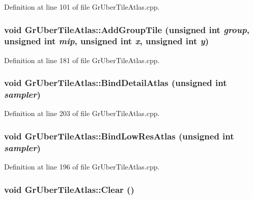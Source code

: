 Definition at line 101 of file GrUberTileAtlas.cpp.\hypertarget{class_gr_uber_tile_atlas_9faf8c4dffaac3e9903aacc01f2ad90e}{
\subsubsection[{AddGroupTile}]{\setlength{\rightskip}{0pt plus 5cm}void GrUberTileAtlas::AddGroupTile (unsigned int {\em group}, \/  unsigned int {\em mip}, \/  unsigned int {\em x}, \/  unsigned int {\em y})}}
\label{class_gr_uber_tile_atlas_9faf8c4dffaac3e9903aacc01f2ad90e}




Definition at line 181 of file GrUberTileAtlas.cpp.\hypertarget{class_gr_uber_tile_atlas_a0d04de78e4271c4f8cadd25b2a3b022}{
\subsubsection[{BindDetailAtlas}]{\setlength{\rightskip}{0pt plus 5cm}void GrUberTileAtlas::BindDetailAtlas (unsigned int {\em sampler})}}
\label{class_gr_uber_tile_atlas_a0d04de78e4271c4f8cadd25b2a3b022}




Definition at line 203 of file GrUberTileAtlas.cpp.\hypertarget{class_gr_uber_tile_atlas_9dbe98672876ba6634bd3a7e83f55183}{
\subsubsection[{BindLowResAtlas}]{\setlength{\rightskip}{0pt plus 5cm}void GrUberTileAtlas::BindLowResAtlas (unsigned int {\em sampler})}}
\label{class_gr_uber_tile_atlas_9dbe98672876ba6634bd3a7e83f55183}




Definition at line 196 of file GrUberTileAtlas.cpp.\hypertarget{class_gr_uber_tile_atlas_8b0b949e6e74b518ae4469afd10d89a9}{
\subsubsection[{Clear}]{\setlength{\rightskip}{0pt plus 5cm}void GrUberTileAtlas::Clear ()}}
\label{class_gr_uber_tile_atlas_8b0b949e6e74b518ae4469afd10d89a9}





